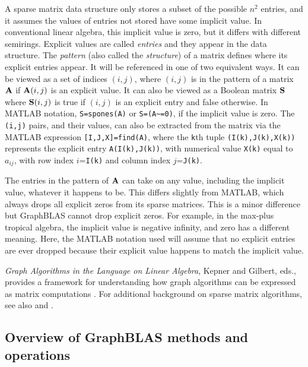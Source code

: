 \documentclass[12pt]{article}
\begin{document}
A sparse matrix data structure only stores a subset of the possible $n^2$
entries, and it assumes the values of entries not stored have some implicit
value.  In conventional linear algebra, this implicit value is zero, but it
differs with different semirings.  Explicit values are called {\em entries} and
they appear in the data structure.  The {\em pattern} (also called the
{\em structure}) of a matrix  defines where its explicit entries appear.  It
will be referenced in one of two equivalent ways.  It can be viewed as a set of
indices $(i,j)$, where $(i,j)$ is in the pattern of a matrix ${\bf A}$ if ${\bf
A}(i,j)$ is an explicit value.  It can also be viewed as a Boolean matrix ${\bf
S}$ where ${\bf S}(i,j)$ is true if $(i,j)$ is an explicit entry and false
otherwise.  In MATLAB notation, \verb'S=spones(A)' or \verb'S=(A~=0)', if the
implicit value is zero.  The \verb'(i,j)' pairs, and their values, can also be
extracted from the matrix via the MATLAB expression \verb'[I,J,X]=find(A)',
where the \verb'k'th tuple \verb'(I(k),J(k),X(k))' represents the explicit
entry \verb'A(I(k),J(k))', with numerical value \verb'X(k)' equal to $a_{ij}$,
with row index $i$=\verb'I(k)' and column index $j$=\verb'J(k)'.

The entries in the pattern of ${\bf A}$ can take on any value, including the
implicit value, whatever it happens to be.  This differs slightly from MATLAB,
which always drops all explicit zeros from its sparse matrices.  This is a
minor difference but GraphBLAS cannot drop explicit zeros.  For example, in the
max-plus tropical algebra, the implicit value is negative infinity, and zero
has a different meaning.  Here, the MATLAB notation used will assume that no
explicit entries are ever dropped because their explicit value happens to match
the implicit value.

{\em Graph Algorithms in the Language on Linear Algebra}, Kepner and Gilbert,
eds., provides a framework for understanding how graph algorithms can be
expressed as matrix computations \cite{KepnerGilbert2011}.  For additional
background on sparse matrix algorithms, see also \cite{Davis06book} and
\cite{DavisRajamanickamSidLakhdar16}.

\subsection{Overview of GraphBLAS methods and operations} %
\label{overview}
\end{document}
